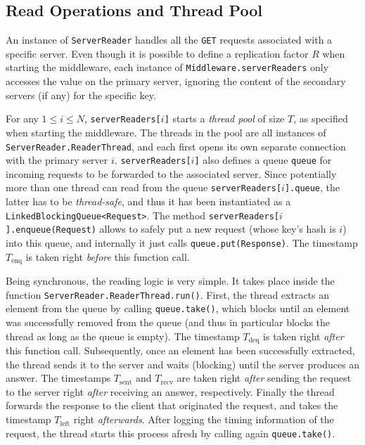 \documentclass[11pt]{article}
\theoremstyle{definition}
\newcommand\Tenq{T_{\mathrm{enq}}}
\newcommand\Tdeq{T_{\mathrm{deq}}}
\newcommand\Tsent{T_{\mathrm{sent}}}
\newcommand\Trecv{T_{\mathrm{recv}}}
\newcommand\Tleft{T_{\mathrm{left}}}
\renewcommand\t\texttt
\begin{document}
\clearpage
\subsection{Read Operations and Thread Pool}\label{sec:desc:reads}

An instance of \t{ServerReader} handles all the \t{GET} requests associated with a specific server.
Even though it is possible to define a replication factor $R$ when starting the middleware, each instance of \t{Middleware.serverReaders} only accesses the value on the primary server, ignoring the content of the secondary servers (if any) for the specific key.

For any $1\leq i\leq N$, \t{serverReaders[$i$]} starts a \emph{thread pool} of size $T$, as specified when starting the middleware.
The threads in the pool are all instances of \t{ServerReader.ReaderThread}, and each first opens its own separate connection with the primary server $i$.
\t{serverReaders[$i$]} also defines a queue \t{queue} for incoming requests to be forwarded to the associated server.
Since potentially more than one thread can read from the queue \t{serverReaders[$i$].queue}, the latter has to be \emph{thread-safe}, and thus it has been instantiated as a \t{LinkedBlockingQueue<Request>}.
The method \t{serverReaders[$i$].enqueue(Request)} allows to safely put a new request (whose key's hash is $i$) into this queue, and internally it just calls \t{queue.put(Response)}. %
The timestamp $\Tenq$ is taken right \emph{before} this function call.

Being synchronous, the reading logic is very simple.
It takes place inside the function \t{ServerReader.ReaderThread.run()}.
First, the thread extracts an element from the queue by calling \t{queue.take()}, which blocks until an element was successfully removed from the queue (and thus in particular blocks the thread as long as the queue is empty).
The timestamp $\Tdeq$ is taken right \emph{after} this function call.
Subsequently, once an element has been successfully extracted, the thread sends it to the server and waits (blocking) until the server produces an answer.
The timestamps $\Tsent$ and $\Trecv$ are taken right \emph{after} sending the request to the server right \emph{after} receiving an answer, respectively.
Finally the thread forwards the response to the client that originated the request, and takes the timestamp $\Tleft$ right \emph{afterwards}.
After logging the timing information of the request, the thread starts this process afresh by calling again \t{queue.take()}.
\end{document}
